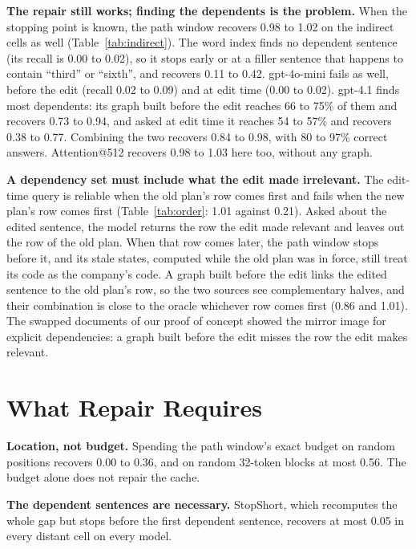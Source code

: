 \documentclass[conference]{IEEEtran}
\begin{document}
\textbf{The repair still works; finding the dependents is the problem.} When the stopping point is known, the
path window recovers 0.98 to 1.02 on the indirect cells as well (Table~\ref{tab:indirect}). The word index finds
no dependent sentence (its recall is 0.00 to 0.02), so it stops early or at a filler sentence that happens to
contain ``third'' or ``sixth'', and recovers 0.11 to 0.42. gpt-4o-mini fails as well, before the edit (recall 0.02
to 0.09) and at edit time (0.00 to 0.02). gpt-4.1 finds most dependents: its graph built before the edit reaches
66 to 75\% of them and recovers 0.73 to 0.94, and asked at edit time it reaches 54 to 57\% and recovers 0.38 to
0.77. Combining the two recovers 0.84 to 0.98, with 80 to 97\% correct answers. Attention@512 recovers 0.98 to
1.03 here too, without any graph.

\textbf{A dependency set must include what the edit made irrelevant.} The edit-time query is reliable when the
old plan's row comes first and fails when the new plan's row comes first (Table~\ref{tab:order}: 1.01 against
0.21). Asked about the edited sentence, the model returns the row the edit made relevant and leaves out the row
of the old plan. When that row comes later, the path window stops before it, and its stale states, computed
while the old plan was in force, still treat its code as the company's code. A graph built before the edit
links the edited sentence to the old plan's row, so the two sources see complementary halves, and their
combination is close to the oracle whichever row comes first (0.86 and 1.01). The swapped documents of our proof
of concept showed the mirror image for explicit dependencies: a graph built before the edit misses the row
the edit makes relevant.

\section{What Repair Requires}
\label{sec:controls}

\textbf{Location, not budget.} Spending the path window's exact budget on random positions recovers 0.00 to
0.36, and on random 32-token blocks at most 0.56. The budget alone does not repair the cache.

\textbf{The dependent sentences are necessary.} StopShort, which recomputes the whole gap but stops before the
first dependent sentence, recovers at most 0.05 in every distant cell on every model.
\end{document}
